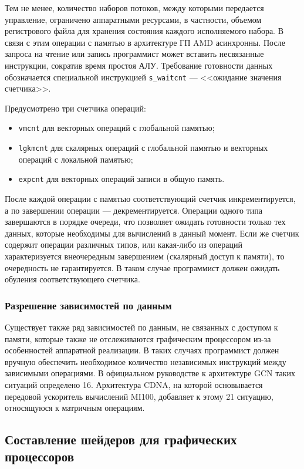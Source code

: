 \documentclass[a4paper,14pt]{extarticle}
\newenvironment{ul}{\begin{itemize}[noitemsep,topsep=0em]}{\end{itemize}\vspace{4mm}}
\begin{document}
Тем не менее, количество наборов потоков, между которыми передается управление, ограничено
аппаратными ресурсами, в частности, объемом регистрового файла для хранения состояния каждого
исполняемого набора. В связи с этим операции с памятью в архитектуре ГП AMD асинхронны.
После запроса на чтение или запись программист может вставить несвязанные инструкции,
сократив время простоя АЛУ. Требование готовности данных обозначается специальной
инструкцией \texttt{s\_waitcnt} — <<ожидание значения счетчика>>.

Предусмотрено три счетчика операций:
\begin{ul}
\item \texttt{vmcnt} для векторных операций с глобальной памятью;
\item \texttt{lgkmcnt} для скалярных операций с глобальной памятью и векторных операций с локальной памятью;
\item \texttt{expcnt} для векторных операций записи в общую память.
\end{ul}

После каждой операции с памятью соответствующий счетчик инкрементируется, а по завершении
операции — декрементируется. Операции одного типа завершаются в порядке очереди, что
позволяет ожидать готовности только тех данных, которые необходимы для вычислений в данный
момент. Если же счетчик содержит операции различных типов, или какая-либо из операций
характеризуется внеочередным завершением (скалярный доступ к памяти), то очередность не гарантируется.
В таком случае программист должен ожидать обуления соответствующего счетчика.

\subsubsection{Разрешение зависимостей по данным}

Существует также ряд зависимостей по данным, не связанных с доступом к памяти,
которые также не отслеживаются графическим процессором из-за особенностей аппаратной реализации.
В таких случаях программист должен вручную обеспечить необходимое количество независимых
инструкций между зависимыми операциями. В официальном руководстве к архитектуре GCN
таких ситуаций определено 16\cite{vega-isa}. Архитектура CDNA, на которой основывается передовой ускоритель
вычислений MI100, добавляет к этому 21 ситуацию, относящуюся к матричным операциям\cite{cdna-isa}.

\subsection{Составление шейдеров для графических процессоров}
\end{document}
